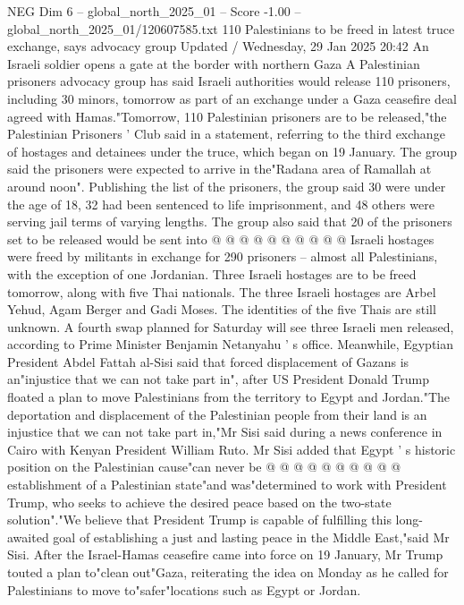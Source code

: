 \begin{textsample}{NEG Dim 6 – global\_north\_2025\_01 – Score -1.00 – global\_north\_2025\_01/120607585.txt}  \label{ex:f6_neg_103}
110 Palestinians to be freed in latest truce exchange, says advocacy group Updated / Wednesday, 29 Jan 2025 20:42 An Israeli soldier opens a gate at the border with northern Gaza A Palestinian prisoners advocacy group has said Israeli authorities would release 110 prisoners, including 30 minors, tomorrow as part of an exchange under a Gaza ceasefire deal agreed with Hamas."Tomorrow, 110 Palestinian prisoners are to be released,"the Palestinian Prisoners ' Club said in a statement, referring to the third exchange of hostages and detainees under the truce, which began on 19 January.
The group said the prisoners were expected to arrive in the"Radana area of Ramallah at around noon".
Publishing the list of the prisoners, the group said 30 were under the age of 18, 32 had been sentenced to life imprisonment, and 48 others were serving jail terms of varying lengths.
The group also said that 20 of the prisoners set to be released would be sent into @ @ @ @ @ @ @ @ @ @ Israeli hostages were freed by militants in exchange for 290 prisoners -- almost all Palestinians, with the exception of one Jordanian.
Three Israeli hostages are to be freed tomorrow, along with five Thai nationals.
The three Israeli hostages are Arbel Yehud, Agam Berger and Gadi Moses.
The identities of the five Thais are still unknown.
A fourth swap planned for Saturday will see three Israeli men released, according to Prime Minister Benjamin Netanyahu ' s office.
Meanwhile, Egyptian President Abdel Fattah al-Sisi said that forced displacement of Gazans is an"injustice that we can not take part in", after US President Donald Trump floated a plan to move Palestinians from the territory to Egypt and Jordan."The deportation and displacement of the Palestinian people from their land is an injustice that we can not take part in,"Mr Sisi said during a news conference in Cairo with Kenyan President William Ruto.
Mr Sisi added that Egypt ' s historic position on the Palestinian cause"can never be @ @ @ @ @ @ @ @ @ @ establishment of a Palestinian state"and was"determined to work with President Trump, who seeks to achieve the desired peace based on the two-state solution"."We believe that President Trump is capable of fulfilling this long-awaited goal of establishing a just and lasting peace in the Middle East,"said Mr Sisi.
After the Israel-Hamas ceasefire came into force on 19 January, Mr Trump touted a plan to"clean out"Gaza, reiterating the idea on Monday as he called for Palestinians to move to"safer"locations such as Egypt or Jordan.

\end{textsample}
